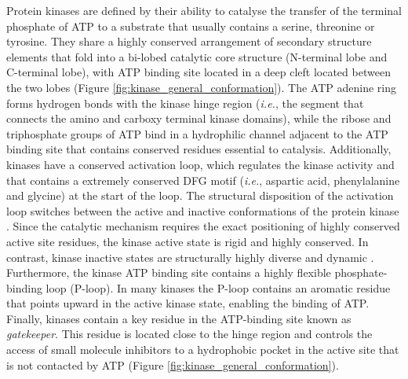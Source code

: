 \documentclass[11pt, b5paper,twoside]{tesi_upf}
\begin{document}
 \par Protein kinases are defined by their ability to catalyse the transfer of the terminal phosphate of ATP to a substrate that usually contains a serine, threonine or tyrosine. They share a highly conserved arrangement of secondary structure elements that fold into a bi-lobed catalytic core structure (N-terminal lobe and C-terminal lobe), with ATP binding site located in a deep cleft located between the two lobes \cite{Manning2002} (Figure \ref{fig:kinase_general_conformation}). The ATP adenine ring forms hydrogen bonds with the kinase hinge region (\textit{i.e.}, the segment that connects the amino and carboxy terminal kinase domains), while the ribose and triphosphate groups of ATP bind in a hydrophilic channel adjacent to the ATP binding site that contains conserved residues essential to catalysis. Additionally, kinases have a conserved activation loop, which regulates the kinase activity and that contains a extremely conserved DFG motif (\textit{i.e.}, aspartic acid, phenylalanine and glycine) at the start of the loop. The structural disposition of the activation loop switches between the active and inactive conformations of the protein kinase \cite{Manning2002}. Since the catalytic mechanism requires the exact positioning of highly conserved active site residues, the kinase active state is rigid and highly conserved. In contrast, kinase inactive states are structurally highly diverse and dynamic \cite{Muller2015}. Furthermore, the kinase ATP binding site contains a highly flexible phosphate-binding loop (P-loop). In many kinases the P-loop contains an aromatic residue that points upward in the active kinase state, enabling the binding of ATP. Finally, kinases contain a key residue in the ATP-binding site known as \textit{gatekeeper}. This residue is located close to the hinge region and controls the access of small molecule inhibitors to a hydrophobic pocket in the active site that is not contacted by ATP \cite{Lui1998} (Figure \ref{fig:kinase_general_conformation}).  
 
\end{document}
